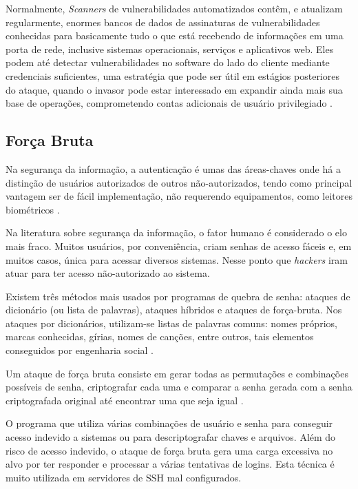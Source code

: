 \documentclass[
	12pt,				
	openright,		
	twoside,	
	a4paper,
	english,	
	brazil	
	]{abntex2}
\begin{document}
Normalmente, \textit{Scanners} de vulnerabilidades automatizados contêm, e atualizam regularmente, enormes bancos de dados de assinaturas de vulnerabilidades conhecidas para basicamente tudo o que está recebendo de informações em uma porta de rede, inclusive sistemas operacionais, serviços e aplicativos web. Eles podem até detectar vulnerabilidades no software do lado do cliente mediante credenciais suficientes, uma estratégia que pode ser útil em estágios posteriores do ataque, quando o invasor pode estar interessado em expandir ainda mais sua base de operações, comprometendo contas adicionais de usuário privilegiado \cite{hackers:stuart-joel}.

\subsection{Força Bruta} \label{sec:forçabruta}

Na segurança da informação, a autenticação é umas das áreas-chaves onde há a distinção de usuários autorizados de outros não-autorizados, tendo como principal vantagem ser de fácil implementação, não requerendo equipamentos, como leitores biométricos \cite{denise-lilian}.

Na literatura sobre segurança da informação, o fator humano é considerado o elo mais fraco. Muitos usuários, por conveniência, criam senhas de acesso fáceis e, em muitos casos, única para acessar diversos sistemas. Nesse ponto que \textit{hackers} iram atuar para ter acesso não-autorizado ao sistema. 

Existem três métodos mais usados por programas de quebra de senha: ataques de dicionário (ou lista de palavras), ataques híbridos e ataques de força-bruta. Nos ataques por dicionários, utilizam-se listas de palavras comuns: nomes próprios, marcas conhecidas, gírias, nomes de canções, entre outros, tais elementos conseguidos por engenharia social \cite{univhacker}. 

 Um ataque de força bruta consiste em gerar todas as permutações e combinações possíveis de senha, criptografar cada uma e comparar a senha gerada com a senha criptografada original até encontrar uma que seja igual \cite{md5crack2012}. 

 O programa que utiliza várias combinações de usuário e senha para conseguir acesso indevido a sistemas ou para descriptografar chaves e arquivos. Além do risco de acesso indevido, o ataque de força bruta gera uma carga excessiva no alvo por ter responder e processar a várias tentativas de logins. Esta técnica é muito utilizada em servidores de SSH mal configurados. 
\end{document}
